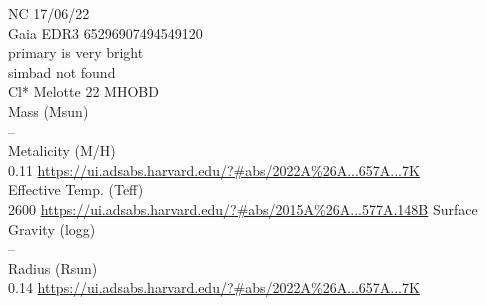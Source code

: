 NC 17/06/22\\
Gaia EDR3 65296907494549120\\
primary is very bright\\
simbad not found\\

Cl* Melotte 22 MHOBD\\
Mass (Msun)\\
--\\
Metalicity (M/H)\\
0.11 \url{https://ui.adsabs.harvard.edu/?#abs/2022A%26A...657A...7K}\\
Effective Temp. (Teff)\\
2600 \url{https://ui.adsabs.harvard.edu/?#abs/2015A%26A...577A.148B}
Surface Gravity (logg)\\
--\\
Radius (Rsun)\\
0.14 \url{https://ui.adsabs.harvard.edu/?#abs/2022A%26A...657A...7K}\\